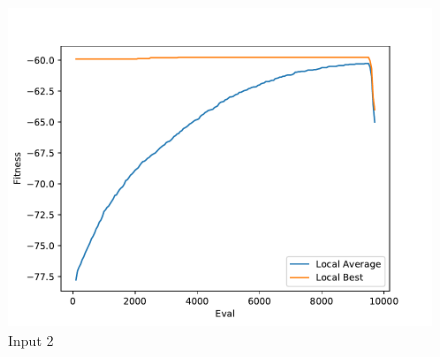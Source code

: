\documentclass{standalone}
\begin{document}
\begin{figure}[!htb]
	\caption{Input 2}
	\label{fig:graph_2015}
	\includegraphics[width=\textwidth]{../graphs/graphs/2015.pdf}
\end{figure}
\end{document}

